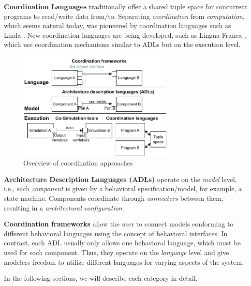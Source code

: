 \documentclass[runningheads]{llncs}
\begin{document}
\textbf{Coordination Languages} traditionally offer a shared tuple space for concurrent programs to read/write data from/to.
Separating \textit{coordination} from \textit{computation}, which seems natural today, was pioneered by coordination languages such as Linda \cite{carrieroLindaContext1989}.
New coordination languages are being developed, such as Lingua Franca \cite{lohstrohReactorsDeterministicModel2020}, which use coordination mechanisms similar to ADLs but on the execution level.

\begin{figure}[ht]
	\centering
	\includegraphics[width=0.7\textwidth]{images/overview}
	\caption{Overview of coordination approaches}
	\label{fig:overview}
\end{figure}

\textbf{Architecture Description Languages (ADLs)} operate on the \textit{model} level, i.e., each \textit{component} is given by a behavioral specification/model, for example, a state machine.
Components coordinate through \textit{connectors} between them, resulting in a \textit{architectural configuration}.

\textbf{Coordination frameworks} allow the user to connect models conforming to different behavioral languages using the concept of behavioral interfaces.
In contrast, each ADL usually only allows one behavioral language, which must be used for each component.
Thus, they operate on the \textit{language} level and give modelers freedom to utilize different languages for varying aspects of the system.

In the following sections, we will describe each category in detail.
\end{document}
